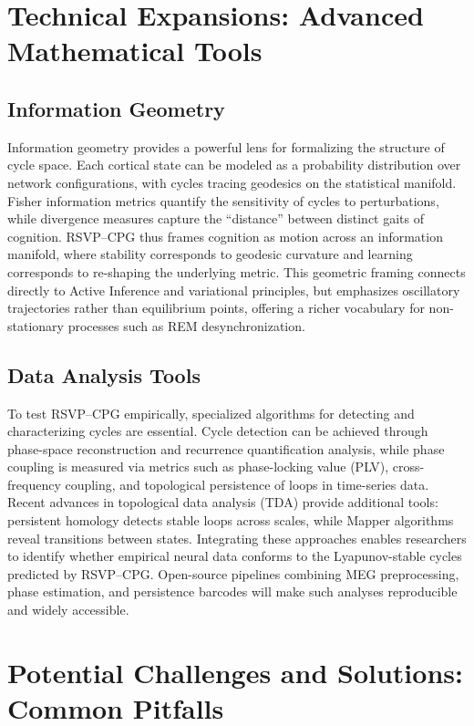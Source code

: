 \documentclass{article}
\begin{document}
\section{Technical Expansions: Advanced Mathematical Tools}

\subsection{Information Geometry}

Information geometry provides a powerful lens for formalizing the structure of cycle space. Each cortical state can be modeled as a probability distribution over network configurations, with cycles tracing geodesics on the statistical manifold. Fisher information metrics quantify the sensitivity of cycles to perturbations, while divergence measures capture the “distance” between distinct gaits of cognition. RSVP--CPG thus frames cognition as motion across an information manifold, where stability corresponds to geodesic curvature and learning corresponds to re-shaping the underlying metric. This geometric framing connects directly to Active Inference and variational principles, but emphasizes oscillatory trajectories rather than equilibrium points, offering a richer vocabulary for non-stationary processes such as REM desynchronization.

\subsection{Data Analysis Tools}

To test RSVP--CPG empirically, specialized algorithms for detecting and characterizing cycles are essential. Cycle detection can be achieved through phase-space reconstruction and recurrence quantification analysis, while phase coupling is measured via metrics such as phase-locking value (PLV), cross-frequency coupling, and topological persistence of loops in time-series data. Recent advances in topological data analysis (TDA) provide additional tools: persistent homology detects stable loops across scales, while Mapper algorithms reveal transitions between states. Integrating these approaches enables researchers to identify whether empirical neural data conforms to the Lyapunov-stable cycles predicted by RSVP--CPG. Open-source pipelines combining MEG preprocessing, phase estimation, and persistence barcodes will make such analyses reproducible and widely accessible.

\section{Potential Challenges and Solutions: Common Pitfalls}
\end{document}
